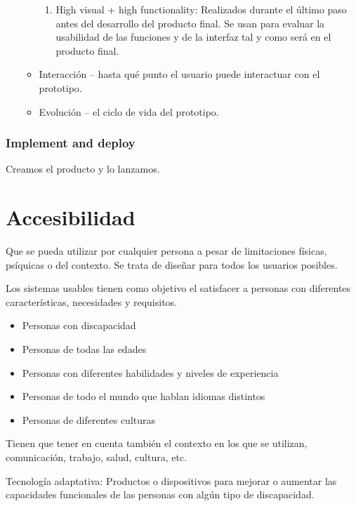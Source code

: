 \documentclass[12pt, twoside, openright]{report} %
\begin{document}
\begin{itemize}
\begin{itemize}
\begin{enumerate}
			            \item High visual + high functionality: Realizados durante el último
			                  paso antes del desarrollo del producto final. Se usan para
			                  evaluar la usabilidad de las funciones y de la interfaz tal y
			                  como será en el producto final.
		            \end{enumerate}

		      \item Interacción -- hasta qué punto el usuario puede interactuar con
		            el prototipo.

		      \item Evolución -- el ciclo de vida del prototipo.
	      \end{itemize}
\end{itemize}

\subsubsection{Implement and deploy}
Creamos el producto y lo lanzamos.


\pagebreak
\section{Accesibilidad}
Que se pueda utilizar por cualquier persona a pesar de limitaciones
físicas, psíquicas o del contexto. Se trata de diseñar para todos los
usuarios posibles.

Los sistemas usables tienen como objetivo el satisfacer a personas con
diferentes características, necesidades y requisitos.

\begin{itemize}
	\item Personas con discapacidad
	\item Personas de todas las edades
	\item Personas con diferentes habilidades y niveles de experiencia
	\item Personas de todo el mundo que hablan idiomas distintos
	\item Personas de diferentes culturas
\end{itemize}

Tienen que tener en cuenta también el contexto en los que se utilizan,
comunicación, trabajo, salud, cultura, etc.

Tecnología adaptativa: Productos o dispositivos para mejorar o
aumentar las capacidades funcionales de las personas con algún tipo de
discapacidad.
\end{document}
